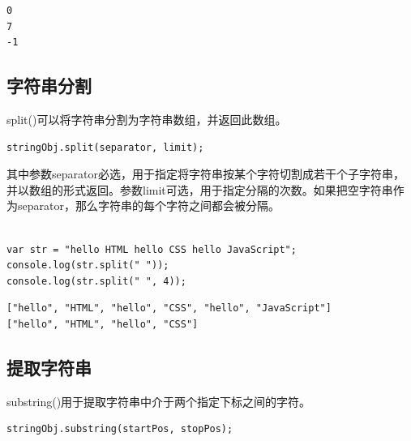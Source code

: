 \begin{tcolorbox}
	\begin{verbatim}
0
7
-1
	\end{verbatim}
\end{tcolorbox}

\vspace{0.5cm}

\subsection{字符串分割}

split()可以将字符串分割为字符串数组，并返回此数组。\\

\begin{lstlisting}[style=htmlcssjs]
stringObj.split(separator, limit);
\end{lstlisting}

其中参数separator必选，用于指定将字符串按某个字符切割成若干个子字符串，并以数组的形式返回。参数limit可选，用于指定分隔的次数。如果把空字符串作为separator，那么字符串的每个字符之间都会被分隔。\\

\\

\begin{lstlisting}[style=htmlcssjs]
var str = "hello HTML hello CSS hello JavaScript";
console.log(str.split(" "));
console.log(str.split(" ", 4));
\end{lstlisting}

\begin{tcolorbox}
	\begin{verbatim}
["hello", "HTML", "hello", "CSS", "hello", "JavaScript"]
["hello", "HTML", "hello", "CSS"]
	\end{verbatim}
\end{tcolorbox}

\vspace{0.5cm}

\subsection{提取字符串}

substring()用于提取字符串中介于两个指定下标之间的字符。\\

\begin{lstlisting}[style=htmlcssjs]
stringObj.substring(startPos, stopPos);
\end{lstlisting}

